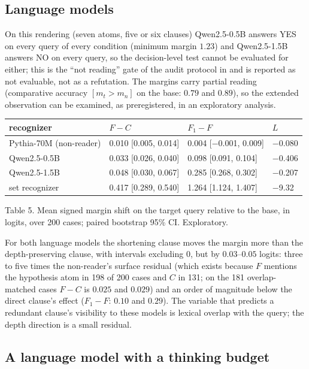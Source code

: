 \subsection{Language models}\label{language-models}

On this rendering (seven atoms, five or six clauses) Qwen2.5-0.5B answers YES on every query of every condition (minimum margin \(1.23\)) and Qwen2.5-1.5B answers NO on every query, so the decision-level test cannot be evaluated for either; this is the ``not reading'' gate of the audit protocol in \cite{ppi2026} and is reported as not evaluable, not as a refutation. The margins carry partial reading (comparative accuracy \([m_t>m_n]\) on the base: \(0.79\) and \(0.89\)), so the extended observation can be examined, as preregistered, in an exploratory analysis.

{\def\LTcaptype{none} %
\begin{longtable}[]{@{}llll@{}}
\toprule\noalign{}
recognizer & \(F-C\) & \(F_1-F\) & \(L\) \\
\midrule\noalign{}
\endhead
\bottomrule\noalign{}
\endlastfoot
Pythia-70M (non-reader) & 0.010 {[}0.005, 0.014{]} & 0.004 {[}−0.001, 0.009{]} & −0.080 \\
Qwen2.5-0.5B & 0.033 {[}0.026, 0.040{]} & 0.098 {[}0.091, 0.104{]} & −0.406 \\
Qwen2.5-1.5B & 0.048 {[}0.030, 0.067{]} & 0.285 {[}0.268, 0.302{]} & −0.207 \\
set recognizer & 0.417 {[}0.289, 0.540{]} & 1.264 {[}1.124, 1.407{]} & −9.32 \\
\end{longtable}
}

Table 5. Mean signed margin shift on the target query relative to the base, in logits, over 200 cases; paired bootstrap 95\% CI. Exploratory.

For both language models the shortening clause moves the margin more than the depth-preserving clause, with intervals excluding \(0\), but by \(0.03\)--\(0.05\) logits: three to five times the non-reader's surface residual (which exists because \(F\) mentions the hypothesis atom in 198 of 200 cases and \(C\) in 131; on the 181 overlap-matched cases \(F-C\) is \(0.025\) and \(0.029\)) and an order of magnitude below the direct clause's effect (\(F_1-F\): \(0.10\) and \(0.29\)). The variable that predicts a redundant clause's visibility to these models is lexical overlap with the query; the depth direction is a small residual.

\subsection{A language model with a thinking budget}\label{a-language-model-with-a-thinking-budget}

